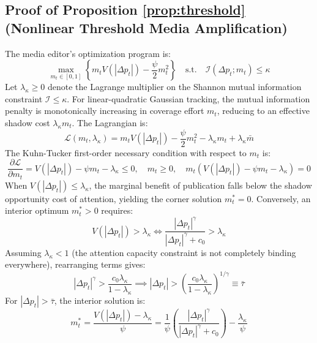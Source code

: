 \documentclass[12pt, a4paper]{article}
\begin{document}
\subsection{Proof of Proposition \ref{prop:threshold} (Nonlinear Threshold Media Amplification)}
\label{app:proof_prop1}
The media editor's optimization program is:
\begin{equation}
\max_{m_t \in [0, 1]} \left\{ m_t V(|\Delta p_t|) - \frac{\psi}{2} m_t^2 \right\} \quad \text{s.t.} \quad \mathcal{I}(\Delta p_t; m_t) \le \kappa
\end{equation}
Let $\lambda_\kappa \ge 0$ denote the Lagrange multiplier on the Shannon mutual information constraint $\mathcal{I} \le \kappa$. For linear-quadratic Gaussian tracking, the mutual information penalty is monotonically increasing in coverage effort $m_t$, reducing to an effective shadow cost $\lambda_\kappa m_t$. The Lagrangian is:
\begin{equation}
\mathcal{L}(m_t, \lambda_\kappa) = m_t V(|\Delta p_t|) - \frac{\psi}{2} m_t^2 - \lambda_\kappa m_t + \lambda_\kappa \bar{m}
\end{equation}
The Kuhn-Tucker first-order necessary condition with respect to $m_t$ is:
\begin{equation}
\frac{\partial \mathcal{L}}{\partial m_t} = V(|\Delta p_t|) - \psi m_t - \lambda_\kappa \le 0, \quad m_t \ge 0, \quad m_t \left( V(|\Delta p_t|) - \psi m_t - \lambda_\kappa \right) = 0
\end{equation}
When $V(|\Delta p_t|) \le \lambda_\kappa$, the marginal benefit of publication falls below the shadow opportunity cost of attention, yielding the corner solution $m_t^* = 0$. Conversely, an interior optimum $m_t^* > 0$ requires:
\begin{equation}
V(|\Delta p_t|) > \lambda_\kappa \iff \frac{|\Delta p_t|^\gamma}{|\Delta p_t|^\gamma + c_0} > \lambda_\kappa
\end{equation}
Assuming $\lambda_\kappa < 1$ (the attention capacity constraint is not completely binding everywhere), rearranging terms gives:
\begin{equation}
|\Delta p_t|^\gamma > \frac{c_0 \lambda_\kappa}{1 - \lambda_\kappa} \implies |\Delta p_t| > \left( \frac{c_0 \lambda_\kappa}{1 - \lambda_\kappa} \right)^{1/\gamma} \equiv \bar{\tau}
\end{equation}
For $|\Delta p_t| > \bar{\tau}$, the interior solution is:
\begin{equation}
m_t^* = \frac{V(|\Delta p_t|) - \lambda_\kappa}{\psi} = \frac{1}{\psi} \left( \frac{|\Delta p_t|^\gamma}{|\Delta p_t|^\gamma + c_0} \right) - \frac{\lambda_\kappa}{\psi}
\end{equation}
\end{document}
